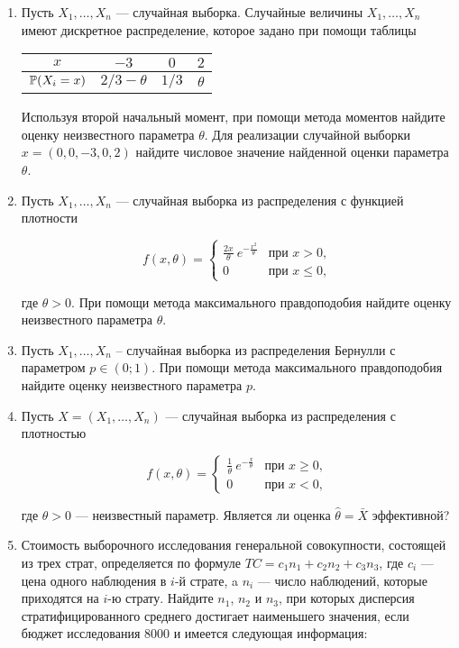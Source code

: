 \begin{enumerate}
\item Пусть $X_1, \ldots, X_n$ — случайная выборка. Случайные величины $X_1, \ldots, X_n$ имеют дискретное распределение, которое задано при помощи таблицы

\begin{center}
\begin{tabular}{cccc}
\toprule
 $x$ & $-3$  &$ 0 $  & $2 $  \\
 \midrule
 $\P(X_i = x)$ & $2/3 - \theta$ & $1/3$ & $\theta$ \\
 \bottomrule
\end{tabular}
\end{center}

Используя второй начальный момент, при помощи метода моментов
найдите оценку неизвестного параметра $\theta$.
Для реализации случайной выборки $x=(0, 0, -3, 0, 2)$
найдите числовое значение найденной оценки параметра $\theta$.

\item Пусть $X_1, \ldots, X_n$ — случайная выборка из распределения
с функцией плотности

\[
f(x,\theta) =
\begin{cases}
\frac{2x}{\theta} \ e^{-\frac{x^2}{\theta}} & \text{при } x>0, \\
0 & \text{при } x \leq 0,
\end{cases}
\]

где $\theta > 0$. При помощи метода максимального правдоподобия найдите оценку неизвестного параметра $\theta$.

\item Пусть $X_1, \ldots, X_n$ – случайная выборка из распределения Бернулли
с параметром $p \in (0;1)$.
При помощи метода максимального правдоподобия найдите оценку
неизвестного параметра $p$.

\item Пусть $X=(X_1, \ldots, X_n)$ — случайная выборка из распределения с плотностью

\[
f(x,\theta) =
\begin{cases}
\frac{1}{\theta} \ e^{-\frac{x}{\theta}} & \text{при } x \geq 0, \\
0 & \text{при } x < 0, \end{cases}
\]

где $\theta > 0$ — неизвестный параметр. Является ли оценка  $\hat{\theta} = \bar{X}$ эффективной?

\item Стоимость выборочного исследования генеральной совокупности,
состоящей из трех страт, определяется по формуле
$TC = c_1n_1 + c_2n_2 + c_3n_3$, где $c_i$ — цена одного наблюдения в $i$-й страте,
a $n_i$ — число наблюдений, которые приходятся на $i$-ю страту.
Найдите $n_1$, $n_2$ и $n_3$, при которых дисперсия стратифицированного среднего
достигает наименьшего значения,
если бюджет исследования 8000 и имеется следующая информация:


\end{enumerate}
